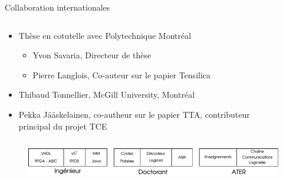 \documentclass[t,compress,mathserif,12pt,xcolor=dvipsnames]{beamer}
\begin{document}
\begin{frame}[t]{Collaboration internationales}
  \begin{minipage}[t][5.0cm][t]{\textwidth}
    \begin{columns}
      \begin{column}{0.63\textwidth}
        \vspace{-30pt}
        \begin{itemize}
          \item Thèse en cotutelle avec Polytechnique Montréal
          \begin{itemize}
          \item Yvon Savaria, Directeur de thèse
          \item Pierre Langlois, Co-auteur sur le papier Tensilica
          \end{itemize}
          \item Thibaud Tonnellier, McGill University, Montréal
          \item Pekka Jääskelainen, co-autheur sur le papier TTA, contributeur principal du projet TCE
        \end{itemize}      \end{column}
      \begin{column}{0.04\textwidth}

      \end{column}
      \begin{column}{0.33\textwidth}
      \end{column}
    \end{columns}
  \end{minipage}
  \begin{figure}[htp]
    \centering
    \includegraphics[width=\textwidth]{fig/frise}
  \end{figure}


\end{frame}
\end{document}
